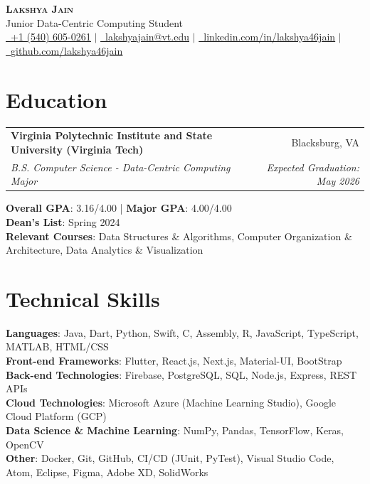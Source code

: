 \documentclass[a4paper,11pt]{article}
\makeatletter
\newcommand{\resumeSubheading}[4]{
  \vspace{-2pt}\item
    \begin{tabular*}{0.97\textwidth}[t]{l@{\extracolsep{\fill}}r}
      \textbf{#1} & #2 \\
      \textit{\small#3} & \textit{\small #4} \\
    \end{tabular*}\vspace{-7pt}
}
\newcommand{\resumeSubHeadingListStart}{\begin{itemize}[leftmargin=0.15in, label={}]}
\newcommand{\resumeSubHeadingListEnd}{\end{itemize}}
\newcommand{\resumeItemizeListStart}{\begin{itemize}[leftmargin=0.15in, label={}]}
\newcommand{\resumeItemizeListEnd}{\vspace{-5pt}\end{itemize}}
\makeatother
\begin{document}
\begin{center}
    \textbf{\Huge \scshape Lakshya Jain} \\ \vspace{5pt}
    Junior Data-Centric Computing Student \\ \vspace{7pt}
    \small \href{tel:+15406050261}{\faPhone\ \underline{+1 (540) 605-0261}} $|$ 
    \href{mailto:lakshyajain@vt.edu}{\faEnvelope\ \underline{lakshyajain@vt.edu}} $|$ 
    \href{https://linkedin.com/in/lakshya46jain}{\faLinkedinSquare\ \underline{linkedin.com/in/lakshya46jain}} $|$ 
    \href{https://github.com/lakshya46jain}{\faGithub\ \underline{github.com/lakshya46jain}}
\end{center}

\section{Education}
  \resumeSubHeadingListStart
    \resumeSubheading
      {Virginia Polytechnic Institute and State University (Virginia Tech)}{Blacksburg, VA}
      {B.S. Computer Science - Data-Centric Computing Major}{Expected Graduation: May 2026}
      \resumeItemizeListStart
        \small{\item{
        \textbf{Overall GPA}{: 3.16/4.00} | \textbf{Major GPA}{: 4.00/4.00}\\
        \textbf{Dean's List}{: Spring 2024} \\
        \textbf{Relevant Courses}{: Data Structures \& Algorithms, Computer Organization \& Architecture, Data Analytics \& Visualization} \\
        }}
      \resumeItemizeListEnd
  \resumeSubHeadingListEnd

\section{Technical Skills}
 \resumeItemizeListStart
    \small{\item{
     \textbf{Languages}{: Java, Dart, Python, Swift, C, Assembly, R, JavaScript, TypeScript, MATLAB, HTML/CSS} \\
     \textbf{Front-end Frameworks}{: Flutter, React.js, Next.js, Material-UI, BootStrap} \\
     \textbf{Back-end Technologies}{: Firebase, PostgreSQL, SQL, Node.js, Express, REST APIs} \\
     \textbf{Cloud Technologies}{: Microsoft Azure (Machine Learning Studio), Google Cloud Platform (GCP)} \\
     \textbf{Data Science \& Machine Learning}{: NumPy, Pandas, TensorFlow, Keras, OpenCV} \\
     \textbf{Other}{: Docker, Git, GitHub, CI/CD (JUnit, PyTest), Visual Studio Code, Atom, Eclipse, Figma, Adobe XD, SolidWorks} \\
    }}
 \resumeItemizeListEnd
\end{document}
